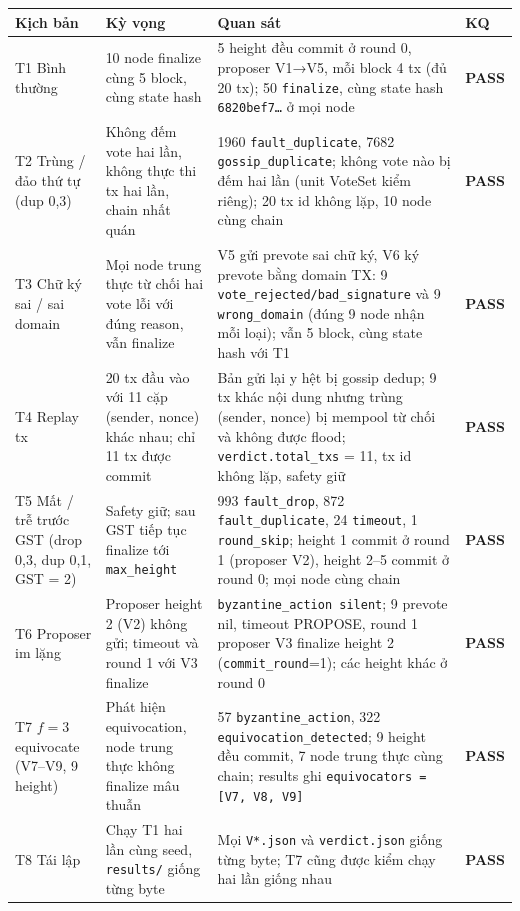 \documentclass[11pt,a4paper]{article}
\newcommand{\code}[1]{\texttt{#1}}
\newcommand{\pass}{\textbf{\color{okgreen}PASS}}
\begin{document}
{\footnotesize
\renewcommand{\arraystretch}{1.1}
\begin{longtable}{@{}L{1.85cm} L{3.7cm} L{8.85cm} C{0.9cm}@{}}
\toprule
\textbf{Kịch bản} & \textbf{Kỳ vọng} & \textbf{Quan sát} & \textbf{KQ} \\
\midrule
\endhead
T1 Bình thường & 10 node finalize cùng 5 block, cùng state hash & 5 height đều commit ở round 0, proposer V1→V5, mỗi block 4 tx (đủ 20 tx); 50 \code{finalize}, cùng state hash \code{6820bef7…} ở mọi node & \pass \\
T2 Trùng / đảo thứ tự (dup 0,3) & Không đếm vote hai lần, không thực thi tx hai lần, chain nhất quán & 1960 \code{fault\_duplicate}, 7682 \code{gossip\_duplicate}; không vote nào bị đếm hai lần (unit VoteSet kiểm riêng); 20 tx id không lặp, 10 node cùng chain & \pass \\
T3 Chữ ký sai / sai domain & Mọi node trung thực từ chối hai vote lỗi với đúng reason, vẫn finalize & V5 gửi prevote sai chữ ký, V6 ký prevote bằng domain TX: 9 \code{vote\_rejected/bad\_signature} và 9 \code{wrong\_domain} (đúng 9 node nhận mỗi loại); vẫn 5 block, cùng state hash với T1 & \pass \\
T4 Replay tx & 20 tx đầu vào với 11 cặp (sender, nonce) khác nhau; chỉ 11 tx được commit & Bản gửi lại y hệt bị gossip dedup; 9 tx khác nội dung nhưng trùng (sender, nonce) bị mempool từ chối và không được flood; \code{verdict.total\_txs} = 11, tx id không lặp, safety giữ & \pass \\
T5 Mất / trễ trước GST (drop 0,3, dup 0,1, GST = 2) & Safety giữ; sau GST tiếp tục finalize tới \code{max\_height} & 993 \code{fault\_drop}, 872 \code{fault\_duplicate}, 24 \code{timeout}, 1 \code{round\_skip}; height 1 commit ở round 1 (proposer V2), height 2--5 commit ở round 0; mọi node cùng chain & \pass \\
T6 Proposer im lặng & Proposer height 2 (V2) không gửi; timeout và round 1 với V3 finalize & \code{byzantine\_action silent}; 9 prevote nil, timeout PROPOSE, round 1 proposer V3 finalize height 2 (\code{commit\_round}=1); các height khác ở round 0 & \pass \\
T7 $f = 3$ equivocate (V7--V9, 9 height) & Phát hiện equivocation, node trung thực không finalize mâu thuẫn & 57 \code{byzantine\_action}, 322 \code{equivocation\_detected}; 9 height đều commit, 7 node trung thực cùng chain; results ghi \code{equivocators = [V7, V8, V9]} & \pass \\
T8 Tái lập & Chạy T1 hai lần cùng seed, \code{results/} giống từng byte & Mọi \code{V*.json} và \code{verdict.json} giống từng byte; T7 cũng được kiểm chạy hai lần giống nhau & \pass \\
\bottomrule
\end{longtable}}
\end{document}
